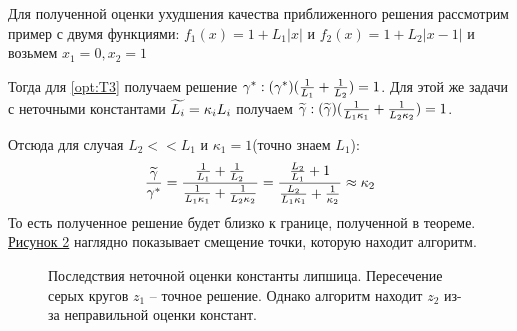 \begin{comments}
    Для полученной оценки ухудшения качества приближенного решения рассмотрим пример с двумя функциями: $f_1(x) = 1 + L_1|x|$ и $f_2(x) = 1 + L_2|x-1|$ и возьмем $x_1 = 0, x_2 = 1$ 

    Тогда для \ref{opt:T3} получаем решение $\gamma^*:(\gamma^*)(\frac{1}{L_1} + \frac{1}{L_2}) = 1$. Для этой же задачи с неточными константами $\widetilde{L_i} = \kappa_i L_i$ получаем $\widetilde{\gamma}:(\widetilde{\gamma})(\frac{1}{L_1\kappa_1} + \frac{1}{L_2\kappa_2}) = 1$.

    Отсюда для случая $L_2 << L_1$ и $\kappa_1 = 1$(точно знаем $L_1$):
    \begin{equation}
        \frac{\widetilde{\gamma}}{\gamma^*} = 
        \frac{\frac{1}{L_1} + \frac{1}{L_2}}{\frac{1}{L_1\kappa_1} + \frac{1}{L_2\kappa_2}} = 
        \frac{\frac{L_2}{L_1} + 1}{\frac{L_2}{L_1\kappa_1} + \frac{1}{\kappa_2}} \approx \kappa_2
    \end{equation}
    То есть полученное решение будет близко к границе, полученной в теореме.  
    \hyperref[fig:theorem_example]{Рисунок 2} наглядно показывает смещение точки, которую находит алгоритм.
    \begin{figure}
\begin{center}    
 \resizebox{0.5\textwidth}{!}{

    } 
        \caption{Последствия неточной оценки константы липшица. Пересечение серых кругов $z_1$ -- точное решение. Однако алгоритм находит $z_2$ из-за неправильной оценки констант.}
\end{center}
\label{fig:theorem_example}
\end{figure}

\end{comments}

